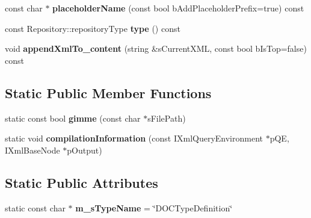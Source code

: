\begin{DoxyCompactItemize}
\item 
\hypertarget{classgeneral__server_1_1DOCTypeDefinition_ad98d053290b51f390e4aaa6799556d3f}{const char $\ast$ {\bfseries placeholder\-Name} (const bool b\-Add\-Placeholder\-Prefix=true) const }\label{classgeneral__server_1_1DOCTypeDefinition_ad98d053290b51f390e4aaa6799556d3f}

\item 
\hypertarget{classgeneral__server_1_1DOCTypeDefinition_a7d41a57c47bd9134d4ff59cef7707177}{const \-Repository\-::repository\-Type {\bfseries type} () const }\label{classgeneral__server_1_1DOCTypeDefinition_a7d41a57c47bd9134d4ff59cef7707177}

\item 
\hypertarget{classgeneral__server_1_1DOCTypeDefinition_a22240c841bdb8955c061f5a39fdedc90}{void {\bfseries append\-Xml\-To\-\_\-content} (string \&s\-Current\-X\-M\-L, const bool b\-Is\-Top=false) const }\label{classgeneral__server_1_1DOCTypeDefinition_a22240c841bdb8955c061f5a39fdedc90}

\end{DoxyCompactItemize}
\subsection*{\-Static \-Public \-Member \-Functions}
\begin{DoxyCompactItemize}
\item 
\hypertarget{classgeneral__server_1_1DOCTypeDefinition_a8694a5c4885c273fa675b13ad9f98227}{static const bool {\bfseries gimme} (const char $\ast$s\-File\-Path)}\label{classgeneral__server_1_1DOCTypeDefinition_a8694a5c4885c273fa675b13ad9f98227}

\item 
\hypertarget{classgeneral__server_1_1DOCTypeDefinition_ad0c02e36b58e3e4664847840ca212009}{static void {\bfseries compilation\-Information} (const \-I\-Xml\-Query\-Environment $\ast$p\-Q\-E, \-I\-Xml\-Base\-Node $\ast$p\-Output)}\label{classgeneral__server_1_1DOCTypeDefinition_ad0c02e36b58e3e4664847840ca212009}

\end{DoxyCompactItemize}
\subsection*{\-Static \-Public \-Attributes}
\begin{DoxyCompactItemize}
\item 
\hypertarget{classgeneral__server_1_1DOCTypeDefinition_a0815423135992d5ee7eac8b0cd1764d5}{static const char $\ast$ {\bfseries m\-\_\-s\-Type\-Name} = \char`\"{}\-D\-O\-C\-Type\-Definition\char`\"{}}\label{classgeneral__server_1_1DOCTypeDefinition_a0815423135992d5ee7eac8b0cd1764d5}

\end{DoxyCompactItemize}
